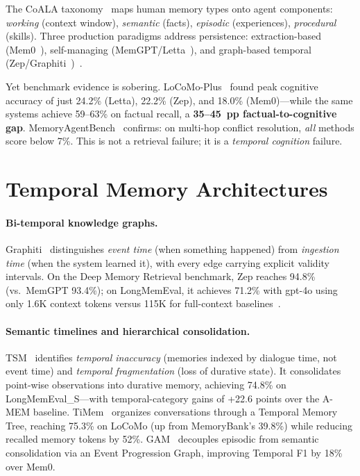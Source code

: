 \documentclass[runningheads]{llncs}
\begin{document}
The CoALA taxonomy~\cite{sumers2024} maps human memory types onto agent
components: \emph{working} (context window), \emph{semantic} (facts),
\emph{episodic} (experiences), \emph{procedural} (skills). Three
production paradigms address persistence: extraction-based
(Mem0~\cite{mem0_2025}), self-managing (MemGPT/Letta~\cite{packer2023}),
and graph-based temporal
(Zep/Graphiti~\cite{rasmussen2025})~\cite{hu2025,zhang2024survey}.

Yet benchmark evidence is sobering. LoCoMo-Plus~\cite{gurawaliya2026}
found peak cognitive accuracy of just 24.2\% (Letta), 22.2\% (Zep), and
18.0\% (Mem0)---while the same systems achieve 59--63\% on factual
recall, a \textbf{35--45~pp factual-to-cognitive gap}.
MemoryAgentBench~\cite{memoryagentbench2026} confirms: on multi-hop
conflict resolution, \emph{all} methods score below 7\%. This is not a
retrieval failure; it is a \emph{temporal cognition} failure.

\section{Temporal Memory Architectures}

\paragraph{Bi-temporal knowledge graphs.}
Graphiti~\cite{rasmussen2025} distinguishes \emph{event time} (when
something happened) from \emph{ingestion time} (when the system learned
it), with every edge carrying explicit validity intervals. On the Deep
Memory Retrieval benchmark, Zep reaches 94.8\% (vs.\ MemGPT 93.4\%);
on LongMemEval, it achieves 71.2\% with gpt-4o using only 1.6K context
tokens versus 115K for full-context baselines~\cite{rasmussen2025}.

\paragraph{Semantic timelines and hierarchical consolidation.}
TSM~\cite{tsm2026} identifies \emph{temporal inaccuracy} (memories indexed
by dialogue time, not event time) and \emph{temporal fragmentation} (loss
of durative state). It consolidates point-wise observations into durative
memory, achieving 74.8\% on LongMemEval\_S---with temporal-category gains
of +22.6 points over the A-MEM baseline. TiMem~\cite{timem2026}
organizes conversations through a Temporal Memory Tree, reaching 75.3\%
on LoCoMo (up from MemoryBank's 39.8\%) while reducing recalled memory
tokens by 52\%. GAM~\cite{gam2026} decouples episodic from semantic
consolidation via an Event Progression Graph, improving Temporal F1
by 18\% over Mem0.
\end{document}
